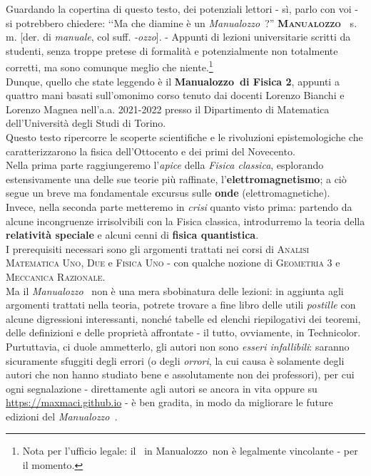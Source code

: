 {\small 
\noindent Guardando la copertina di questo testo, dei potenziali lettori - sì, parlo con voi - si potrebbero chiedere: ‘‘Ma che diamine è un \textit{Manualozzo\texttrademark\ }?''
\vspace{3mm}%
\lettrine[findent=1pt, nindent=0pt]{\textbf{M}}{\textbf{anualozzo\texttrademark\ }} s. m. [der. di \textit{manuale}, col suff. \textit{-ozzo}]. - Appunti di lezioni universitarie scritti da studenti, senza troppe pretese di formalità e potenzialmente non totalmente corretti, ma sono comunque meglio che niente.\footnote{Nota per l'ufficio legale: il \texttrademark\ in Manualozzo\texttrademark\ non è legalmente vincolante - per il momento.}
\vspace{3mm}\\
Dunque, quello che state leggendo è il \textbf{Manualozzo\texttrademark\  di Fisica 2}, appunti a quattro mani basati sull'omonimo corso tenuto dai docenti Lorenzo Bianchi e Lorenzo Magnea nell'a.a. 2021-2022 presso il Dipartimento di Matematica dell'Università degli Studi di Torino.\\
Questo testo ripercorre le scoperte scientifiche e le rivoluzioni epistemologiche che caratterizzarono la fisica dell'Ottocento e dei primi del Novecento. \\
Nella prima parte raggiungeremo l'\textit{apice} della \textit{Fisica classica}, esplorando estensivamente una delle sue teorie più raffinate, l'\textbf{elettromagnetismo}; a ciò segue un breve ma fondamentale excursus sulle \textbf{onde} (elettromagnetiche).\\
Invece, nella seconda parte metteremo in \textit{crisi} quanto visto prima: partendo da alcune incongruenze irrisolvibili con la Fisica classica, introdurremo la teoria della \textbf{relatività speciale} e alcuni cenni di \textbf{fisica quantistica}.\\
I prerequisiti necessari sono gli argomenti trattati nei corsi di \textsc{Analisi Matematica Uno}, \textsc{Due} e \textsc{Fisica Uno} - con qualche nozione di \textsc{Geometria 3} e \textsc{Meccanica Razionale}.\\
Ma il \textit{Manualozzo\texttrademark\ } non è una mera sbobinatura delle lezioni: in aggiunta agli argomenti trattati nella teoria, potrete trovare a fine libro delle utili \textit{postille} con alcune digressioni interessanti, nonché tabelle ed elenchi riepilogativi dei teoremi, delle definizioni e delle proprietà affrontate - il tutto, ovviamente, in Technicolor\texttrademark. %
Purtuttavia, ci duole ammetterlo, gli autori non sono \textit{esseri infallibili}: saranno sicuramente sfuggiti degli errori (o degli \textit{orrori}, la cui causa è solamente degli autori che non hanno studiato bene e assolutamente non dei professori), per cui ogni segnalazione - direttamente agli autori se ancora in vita oppure su \textcolor{redill}{\url{https://maxmaci.github.io}} - è ben gradita, in modo da migliorare le future edizioni del \textit{Manualozzo\texttrademark\ }.}

